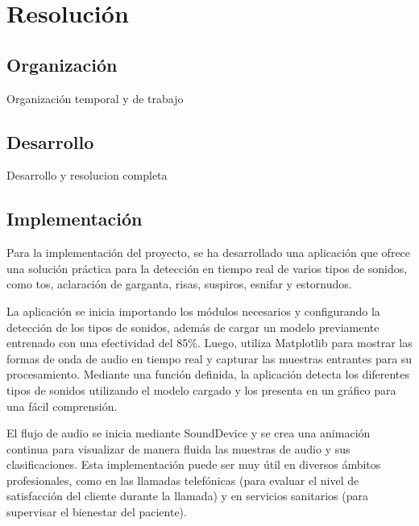 
\section{Resolución}
\subsection{Organización}
Organización temporal y de trabajo

\subsection{Desarrollo}
Desarrollo y resolucion completa
\subsection{Implementación}
Para la implementación del proyecto, se ha desarrollado una aplicación que ofrece una solución práctica para la detección en tiempo real de varios tipos de sonidos, como tos, aclaración de garganta, risas, suspiros, esnifar y estornudos.

La aplicación se inicia importando los módulos necesarios y configurando la detección de los tipos de sonidos, además de cargar un modelo previamente entrenado con una efectividad del 85\%. Luego, utiliza Matplotlib para mostrar las formas de onda de audio en tiempo real y capturar las muestras entrantes para su procesamiento. Mediante una función definida, la aplicación detecta los diferentes tipos de sonidos utilizando el modelo cargado y los presenta en un gráfico para una fácil comprensión.

El flujo de audio se inicia mediante SoundDevice y se crea una animación continua para visualizar de manera fluida las muestras de audio y sus clasificaciones. Esta implementación puede ser muy útil en diversos ámbitos profesionales, como en las llamadas telefónicas (para evaluar el nivel de satisfacción del cliente durante la llamada) y en servicios sanitarios (para supervisar el bienestar del paciente).